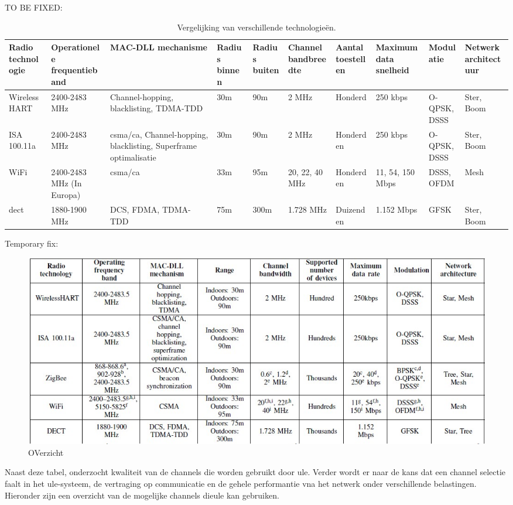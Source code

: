 TO BE FIXED:
\begin{table}[H]
  \centering
  \caption{Vergelijking van verschillende technologieën. \autocite[Door][Copyright 2012 van \citeauthor{Das2012}]{Das2012}}
  \label{tab:comparison}
  \begin{tabular}{|l|l|l|l|l|l|l|l|l|l|}
    \hline
    \textbf{Radio technologie} & \textbf{Operationele frequentieband} & \textbf{MAC-DLL mechanisme} & \textbf{Radius binnen} & \textbf{Radius buiten} & \textbf{Channel bandbreedte} & \textbf{Aantal toestellen} &\textbf{Maximum data snelheid} & \textbf{Modulatie} & \textbf{Netwerk architectuur}\\
    \hline
    WirelessHART & 2400-2483 MHz & Channel-hopping, blacklisting, TDMA-TDD & 30m & 90m & 2 MHz & Honderd & 250 kbps & O-QPSK, DSSS & Ster, Boom\\
    ISA 100.11a & 2400-2483 MHz & \gls{csma/ca}, Channel-hopping, blacklisting, Superframe optimalisatie & 30m & 90m & 2 MHz & Honderden & 250 kbps& O-QPSK, DSSS & Ster, Boom\\
    WiFi & 2400-2483 MHz (In Europa) & \gls{csma/ca} & 33m & 95m & 20, 22, 40 MHz & Honderden & 11, 54, 150 Mbps & DSSS, OFDM & Mesh\\
    \gls{dect} & 1880-1900 MHz & DCS, FDMA, TDMA-TDD & 75m & 300m & 1.728 MHz & Duizenden & 1.152 Mbps & GFSK & Ster, Boom\\
  \end{tabular}
\end{table}

Temporary fix:

\begin{figure}[H]
  \includegraphics[width=\linewidth]{../graphics/overzicht.jpg}
  \caption{OVerzicht \autocite[Door][Copyright 2012 van \citeauthor{Das2012}]{Das2012}}
  \label{fig:overzicht}
\end{figure}


Naast deze tabel, onderzocht \textcite{Das2012} kwaliteit van de channels die worden gebruikt door \gls{ule}. Verder wordt er naar de kans dat een channel selectie faalt in het \gls{ule}-systeem, de vertraging op communicatie en de gehele performantie vna het netwerk onder verschillende belastingen. Hieronder zijn een overzicht van de mogelijke channels die\gls{ule} kan gebruiken.

